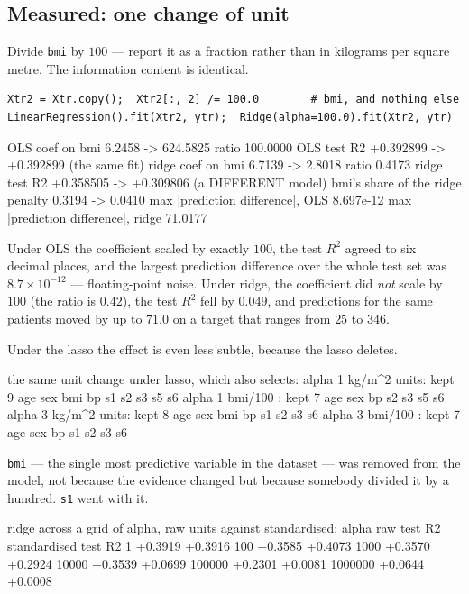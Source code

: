 \documentclass[11pt]{article}
\begin{document}
\subsection{Measured: one change of unit}
\label{sec:unit}

Divide \texttt{bmi} by $100$ --- report it as a fraction rather than in
kilograms per square metre. The information content is identical.

\begin{lstlisting}
Xtr2 = Xtr.copy();  Xtr2[:, 2] /= 100.0        # bmi, and nothing else
LinearRegression().fit(Xtr2, ytr);  Ridge(alpha=100.0).fit(Xtr2, ytr)
\end{lstlisting}
\begin{codeout}
     OLS   coef on bmi       6.2458 ->     624.5825   ratio   100.0000
     OLS   test R2     +0.392899 -> +0.392899   (the same fit)
     ridge coef on bmi       6.7139 ->       2.8018   ratio     0.4173
     ridge test R2     +0.358505 -> +0.309806   (a DIFFERENT model)
     bmi's share of the ridge penalty  0.3194 -> 0.0410
     max |prediction difference|, OLS   8.697e-12
     max |prediction difference|, ridge 71.0177
\end{codeout}

Under OLS the coefficient scaled by exactly $100$, the test $R^2$ agreed to
six decimal places, and the largest prediction difference over the whole test
set was $8.7\times10^{-12}$ --- floating-point noise. Under ridge, the
coefficient did \emph{not} scale by $100$ (the ratio is $0.42$), the test
$R^2$ fell by $0.049$, and predictions for the same patients moved by up to
$\mathbf{71.0}$ on a target that ranges from $25$ to $346$.

Under the lasso the effect is even less subtle, because the lasso deletes.

\begin{codeout}
  the same unit change under lasso, which also selects:
     alpha 1  kg/m^2 units: kept 9  age sex bmi bp s1 s2 s3 s5 s6
     alpha 1  bmi/100    : kept 7  age sex bp s2 s3 s5 s6
     alpha 3  kg/m^2 units: kept 8  age sex bmi bp s1 s2 s3 s6
     alpha 3  bmi/100    : kept 7  age sex bp s1 s2 s3 s6
\end{codeout}

\texttt{bmi} --- the single most predictive variable in the dataset --- was
removed from the model, not because the evidence changed but because somebody
divided it by a hundred. \texttt{s1} went with it.

\begin{codeout}
  ridge across a grid of alpha, raw units against standardised:
        alpha     raw test R2   standardised test R2
              1      +0.3919            +0.3916
            100      +0.3585            +0.4073
           1000      +0.3570            +0.2924
          10000      +0.3539            +0.0699
         100000      +0.2301            +0.0081
        1000000      +0.0644            +0.0008
\end{codeout}
\end{document}
